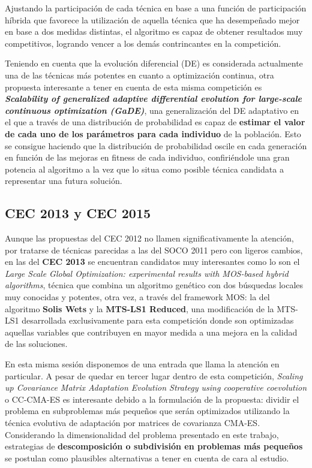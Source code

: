 Ajustando la participación de cada técnica en base a una función de participación híbrida que favorece la utilización de aquella técnica que ha desempeñado mejor en base a dos medidas distintas, el algoritmo es capaz de obtener resultados muy competitivos, logrando vencer a los demás contrincantes en la competición.
 
Teniendo en cuenta que la evolución diferencial (DE)\cite{DE} es considerada actualmente una de las técnicas más potentes en cuanto a optimización continua, otra propuesta interesante a tener en cuenta de esta misma competición es \textbf{\textit{Scalability of generalized adaptive differential evolution for large-scale continuous optimization (GaDE)}}\cite{GaDE}, una generalización del DE adaptativo en el que a través de una distribución de probabilidad es capaz de \textbf{estimar el valor de cada uno de los parámetros para cada individuo} de la población. Esto se consigue haciendo que la distribución de probabilidad oscile en cada generación en función de las mejoras en fitness de cada individuo, confiriéndole una gran potencia al algoritmo a la vez que lo situa como posible técnica candidata a representar una futura solución.

\subsection{CEC 2013 y CEC 2015}

Aunque las propuestas del CEC 2012 no llamen significativamente la atención, por tratarse de técnicas parecidas a las del SOCO 2011 pero con ligeros cambios, en las del \textbf{CEC 2013} se encuentran candidatos muy interesantes como lo son el \textit{Large Scale Global Optimization: experimental results with MOS-based hybrid algorithms}\cite{MOS2013}, técnica que combina un algoritmo genético con dos búsquedas locales muy conocidas y potentes, otra vez, a través del framework MOS: la del algoritmo \textbf{Solis Wets}\cite{SolisWets} y la \textbf{MTS-LS1 Reduced}, una modificación de la MTS-LS1\cite{MTS-LSGO} desarrollada exclusivamente para esta competición donde son optimizadas aquellas variables que contribuyen en mayor medida a una mejora en la calidad de las soluciones.

En esta misma sesión disponemos de una entrada que llama la atención en particular. A pesar de quedar en tercer lugar dentro de esta competición, \textit{Scaling up Covariance Matrix Adaptation Evolution Strategy using cooperative coevolution} o CC-CMA-ES\cite{CC-CMAES} es interesante debido a la formulación de la propuesta: dividir el problema en subproblemas más pequeños que serán optimizados utilizando la técnica evolutiva de adaptación por matrices de covarianza CMA-ES. Considerando la dimensionalidad del problema presentado en este trabajo, estrategias de \textbf{descomposición o subdivisión en problemas más pequeños} se postulan como plausibles alternativas a tener en cuenta de cara al estudio.

